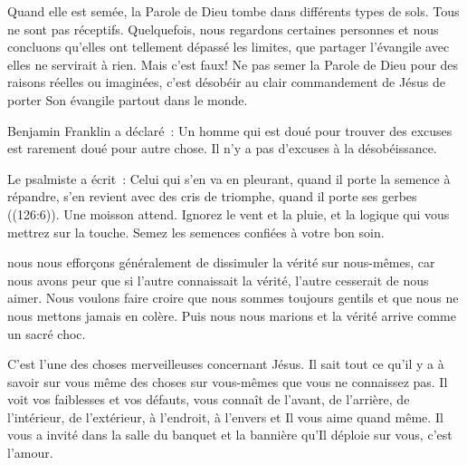 Quand elle est semée, la Parole de Dieu tombe dans différents types de sols.
 Tous ne sont pas réceptifs.
 Quelquefois, nous regardons certaines personnes et nous concluons
 qu'elles ont tellement dépassé les limites, que partager l'évangile 
 avec elles ne servirait à rien. Mais c'est faux!
 Ne pas semer la Parole de Dieu pour des raisons réelles ou imaginées,
 c'est désobéir au clair commandement de Jésus de porter Son évangile 
 partout dans le monde. 

Benjamin Franklin a déclaré~: 
 \og Un homme qui est doué pour trouver des excuses est rarement doué
 pour autre chose. \fg{} Il n'y a pas d'excuses à la désobéissance. 


Le psalmiste a écrit~: 
 \og Celui qui s'en va en pleurant, quand il porte la semence à répandre,
 s'en revient avec des cris de triomphe, quand il porte ses gerbes \fg{} 
 ((126:6)). Une moisson attend. Ignorez le vent et la pluie,
 et la logique qui vous mettrez sur la touche.
 Semez les semences confiées à votre bon soin.

\dvrule






 nous nous efforçons généralement de dissimuler la vérité sur nous-mêmes,
 car nous avons peur que si l'autre connaissait la vérité,
 l'autre cesserait de nous aimer.
 Nous voulons faire croire que nous sommes toujours gentils
 et que nous ne nous mettons jamais en colère.
 Puis nous nous marions et la vérité arrive comme un sacré choc. 

C'est l'une des choses merveilleuses concernant Jésus.
 Il sait tout ce qu'il y a à savoir sur vous
 \ocadr même des choses sur vous-mêmes que vous ne connaissez pas.
 Il voit vos faiblesses et vos défauts, vous connaît de l'avant,
 de l'arrière, de l'intérieur, de l'extérieur, à l'endroit,
 à l'envers et Il vous aime quand même.
 Il vous a invité dans la salle du banquet et la bannière
 qu'Il déploie sur vous, c'est l'amour.

